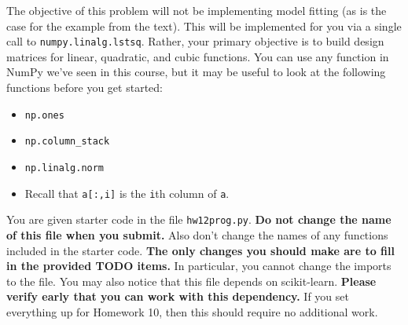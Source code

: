 \documentclass{article}
\theoremstyle{remark}
\begin{document}
The objective of this problem will not be implementing model fitting (as is the case for the example from the text).
This will be implemented for you via a single call to \texttt{numpy.linalg.lstsq}.
Rather, your primary objective is to build design matrices for linear, quadratic, and cubic functions.
You can use any function in NumPy we've seen in this course, but it may be useful to look at the following functions before you get started:
\begin{itemize}
\item \texttt{np.ones}
\item \texttt{np.column\_stack}
\item \texttt{np.linalg.norm}
\item Recall that \texttt{a[:,i]} is the \texttt{i}th column of \texttt{a}.
\end{itemize}
You are given starter code in the file \texttt{hw12prog.py}.
\textbf{Do not change the name of this file when you submit.}
Also don't change the names of any functions included in the starter code.
\textbf{The only changes you should make are to fill in the provided TODO items.}
In particular, you cannot change the imports to the file.
You may also notice that this file depends on scikit-learn.
\textbf{Please verify early that you can work with this dependency.}
If you set everything up for Homework 10, then this should require no additional work.
\end{document}
